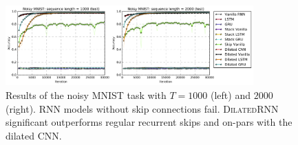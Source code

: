 \documentclass{article}
\newcommand{\algname}{\textsc{DilatedRNN }}
\begin{document}
\begin{figure}[t]
  \centering
  \includegraphics[width=0.85\textwidth]{./figure/noisy_1000_2000_test_only.png}
  \vspace*{-0.0725in}
  \caption{Results of the noisy MNIST task with $T=1000$ (left) and $2000$ (right). RNN models without skip connections fail. \algname significant outperforms regular recurrent skips and on-pars with the dilated CNN.  }
  \label{fig:noisy_1000_2000}
  \vspace*{-0.15in}
\end{figure}
\end{document}

